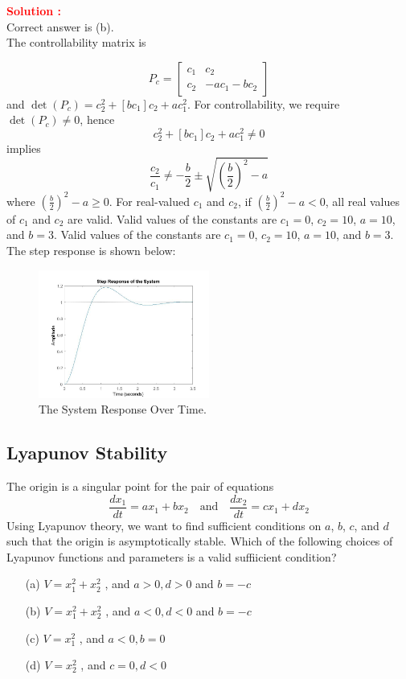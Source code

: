 \documentclass[12pt]{article}
\begin{document}
\textbf{\textcolor{red}{Solution :}} \\
Correct answer is (b).\\

The controllability matrix is 

\[
P_c = \begin{bmatrix} c_1 & c_2 \\ c_2 & -ac_1 - bc_2 \end{bmatrix}
\] 
and \(\det(P_c) = c_2^2 + [bc_1]c_2 + ac_1^2\). For controllability, we require \(\det(P_c) \neq 0\), hence 
\[
c_2^2 + [bc_1]c_2 + ac_1^2 \neq 0
\] 
implies 
\[
\frac{c_2}{c_1} \neq -\frac{b}{2} \pm \sqrt{\left(\frac{b}{2}\right)^2 - a}
\] 
where \(\left(\frac{b}{2}\right)^2 - a \geq 0\). For real-valued \(c_1\) and \(c_2\), if \(\left(\frac{b}{2}\right)^2 - a < 0\), all real values of \(c_1\) and \(c_2\) are valid. Valid values of the constants are \(c_1 = 0\), \(c_2 = 10\), \(a = 10\), and \(b = 3\). Valid values of the constants are \(c_1 = 0\), \(c_2 = 10\), \(a = 10\), and \(b = 3\). The step response is shown below:
\begin{figure}[H]
    \centering
    \includegraphics[width=0.5\textwidth]{figs/10.2.jpg}
    \caption{The System Response Over Time.}
    \label{fig:yb}
\end{figure}
\clearpage

\subsection{Lyapunov Stability}

The origin is a singular point for the pair of equations
\[
\frac{dx_1}{dt} = ax_1 + bx_2 \quad \text{and} \quad \frac{dx_2}{dt} = cx_1 + dx_2
\]
Using Lyapunov theory, we want to find sufficient conditions on \(a\), \(b\), \(c\), and \(d\) such that the origin is asymptotically stable. Which of the following choices of Lyapunov functions and parameters is a valid suffiicient condition?

\begin{itemize}
    \item[(a)] \(V=x_1^2+x_2^2\) , and \(a>0,d>0\) and \(b=-c\) 
    \item[(b)] \(V=x_1^2+x_2^2\) , and \(a<0,d<0\) and \(b=-c\) 
    \item[(c)] \(V=x_1^2\) , and \(a<0 ,b=0\) 
    \item[(d)] \(V=x_2^2\) , and \(c=0 ,d<0\) 
\end{itemize}
\end{document}
